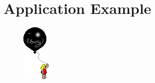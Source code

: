 \chapter{Application Example}

\begin{figure}[htbp]
    \centering
\includegraphics{applicationicon}
\end{figure}

